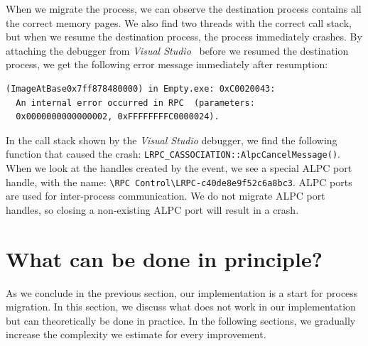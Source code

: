 \documentclass[a4paper, 11pt, english]{report}
\begin{document}
When we migrate the process, we can observe the destination process contains all the correct memory pages. We also find two threads with the correct call stack, but when we resume the destination process, the process immediately crashes. By attaching the debugger from \textit{Visual Studio}~\cite{visual-studio} before we resumed the destination process, we get the following error message immediately after resumption:

\begin{verbatim}
(ImageAtBase0x7ff878480000) in Empty.exe: 0xC0020043:
  An internal error occurred in RPC  (parameters: 
  0x0000000000000002, 0xFFFFFFFFC0000024).
\end{verbatim}

In the call stack shown by the \textit{Visual Studio} debugger, we find the following function that caused the crash: \texttt{LRPC\_CASSOCIATION::AlpcCancelMessage()}. When we look at the handles created by the event, we see a special ALPC port handle, with the name: \texttt{\textbackslash RPC Control\textbackslash LRPC-c40de8e9f52c6a8bc3}. ALPC ports are used for inter-process communication. We do not migrate ALPC port handles, so closing a non-existing ALPC port will result in a crash.

\section{What can be done in principle?}
As we conclude in the previous section, our implementation is a start for process migration. In this section, we discuss what does not work in our implementation but can theoretically be done in practice. In the following sections, we gradually increase the complexity we estimate for every improvement.


%
\end{document}
